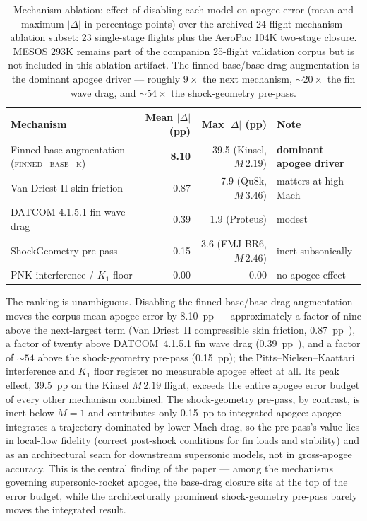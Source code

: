 \begin{table}[htbp]
\centering
\caption{Mechanism ablation: effect of disabling each model on apogee
error (mean and maximum $|\Delta|$ in percentage points) over the archived
24-flight mechanism-ablation subset: 23 single-stage flights plus the AeroPac
104K two-stage closure. MESOS 293K remains part of the companion 25-flight
validation corpus but is not included in this ablation artifact. The
finned-base/base-drag augmentation is the dominant apogee
driver --- roughly $9\times$ the next mechanism, $\sim\!20\times$ the fin wave
drag, and $\sim\!54\times$ the shock-geometry pre-pass.}
\label{tab:ablation}
\small
\setlength{\tabcolsep}{4pt}
\begin{tabularx}{\textwidth}{@{}X r r X@{}}
\toprule
Mechanism & Mean $|\Delta|$ (pp) & Max $|\Delta|$ (pp) & Note \\
\midrule
Finned-base augmentation (\textsc{finned\_base\_k}) & \textbf{8.10} & 39.5 (Kinsel, $M\,2.19$) & \textbf{dominant apogee driver} \\
Van Driest II skin friction~\cite{hopkins1971} & 0.87 & 7.9 (Qu8k, $M\,3.46$) & matters at high Mach \\
DATCOM 4.1.5.1 fin wave drag~\cite{datcom1978} & 0.39 & 1.9 (Proteus) & modest \\
ShockGeometry pre-pass & 0.15 & 3.6 (FMJ BR6, $M\,2.46$) & inert subsonically \\
PNK interference / $K_1$ floor & 0.00 & 0.00 & no apogee effect \\
\bottomrule
\end{tabularx}
\end{table}

The ranking is unambiguous. Disabling the finned-base/base-drag augmentation
moves the corpus mean apogee error by 8.10~pp --- approximately a factor of
nine above the next-largest term (Van Driest~II compressible skin friction,
0.87~pp~\cite{hopkins1971}), a factor of twenty above DATCOM~4.1.5.1 fin wave
drag (0.39~pp~\cite{datcom1978}), and a factor of $\sim\!54$ above the
shock-geometry pre-pass (0.15~pp); the Pitts--Nielsen--Kaattari interference
and $K_1$ floor register no measurable apogee effect at all. Its peak effect,
39.5~pp on the Kinsel $M\,2.19$ flight, exceeds the entire apogee error budget
of every other mechanism combined. The shock-geometry pre-pass, by contrast, is
inert below $M\!=\!1$ and contributes only 0.15~pp to integrated apogee:
apogee integrates a trajectory dominated by lower-Mach drag, so the pre-pass's
value lies in local-flow fidelity (correct post-shock conditions for fin loads
and stability) and as an architectural seam for downstream supersonic models,
not in gross-apogee accuracy. This is the
central finding of the paper --- among the mechanisms governing
supersonic-rocket apogee, the base-drag closure sits at the top of the error
budget, while the architecturally prominent shock-geometry pre-pass barely
moves the integrated result.

